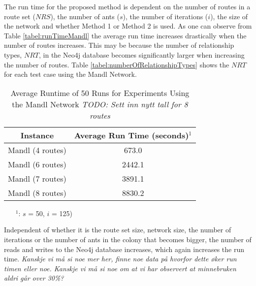The run time for the proposed method is dependent on the number of routes in a route set ($NRS$), the number of ants ($s$), the number of iterations ($i$), the size of the network and whether Method 1 or Method 2 is used. As one can observe from Table \vref{tabel:runTimeMandl} the average run time increases drastically when the number of routes increases. This may be because the number of relationship types, $NRT$, in the Neo4j database becomes significantly larger when increasing the number of routes. Table \vref{tabel:numberOfRelationshipTypes} shows the $NRT$ for each test case using the Mandl Network.  

\begin{table}[H]
    \centering
    \hspace*{-1.0cm}
    \begin{tabular}{|c|c|}
        \hline
        \textbf{Instance} & \textbf{Average Run Time (seconds)$^1$}\\
        \hline
        Mandl (4 routes) & 673.0\\
        \hline
        Mandl (6 routes) & 2442.1\\
        \hline
        Mandl (7 routes) & 3891.1\\
        \hline
        Mandl (8 routes) & 8830.2\\
        \hline
    \end{tabular}
    \caption{Average Runtime of 50 Runs for Experiments Using the Mandl Network \emph{\color{blue} TODO: Sett inn nytt tall for 8 routes}}
    \begin{itemize}[noitemsep]
    \item[$^1$:] $s$ = 50, $i$ = 125)
    \end{itemize} 
    \label{tabel:runTimeMandl}
\end{table}

Independent of whether it is the route set size, network size, the number of iterations or the number of ants in the colony that becomes bigger, the number of reads and writes to the Neo4j database increases, which again increases the run time. \emph{\color{blue} Kanskje vi må si noe mer her, finne noe data på hvorfor dette øker run timen eller noe. Kanskje vi må si noe om at vi har observert at minnebruken aldri går over 30\%?}


